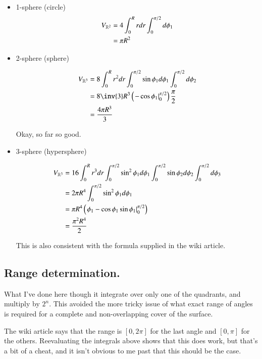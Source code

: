 \begin{itemize}
\item 1-sphere (circle)
\begin{align*}
V_{\mathbb{R}^{2}} 
&= 4 \int_{0}^R r dr \int_{0}^{\pi/2} d\phi_1 \\
&= \pi R^2 
\end{align*}

\item 2-sphere (sphere)

\begin{align*}
V_{\Rm{3}} 
&= 8 \int_0^R r^2 dr \int_0^{\pi/2} \sin\phi_1 d\phi_1 \int_0^{\pi/2} d\phi_2 \\
&= 8 \inv{3} R^3 \left( {\left. -\cos\phi_1 \right\vert}_0^{\pi/2} \right) \frac{\pi}{2} \\
&= \frac{4\pi R^3}{3} \\
\end{align*}

Okay, so far so good.

\item 3-sphere (hypersphere)

\begin{align*}
V_{\mathbb{R}^{3}} 
&= 16 \int_0^R r^3 dr \int_0^{\pi/2} \sin^2\phi_1 d\phi_1 \int_0^{\pi/2} \sin\phi_2 d\phi_2 \int_0^{\pi/2} d\phi_3 \\
&= 2 \pi R^4 \int_0^{\pi/2} \sin^2\phi_1 d\phi_1 \\
&= \pi R^4 \left( {\left.  \phi_1 - \cos\phi_1 \sin\phi_1 \right\vert}_0^{\pi/2} \right) \\
&= \frac{\pi^2 R^4}{2} \\
\end{align*}

This is also consistent with the formula supplied in the wiki article.  

\end{itemize}

\subsection{Range determination. }

What I've done here though it integrate over only one of the quadrants, and multiply by $2^n$.  This avoided the more tricky issue of what exact range of angles is required for a complete and non-overlapping cover of the surface.

The wiki article says that the range is $[0,2\pi]$ for the last angle and $[0,\pi]$ for the others.  
Reevaluating the integrals above shows that this does work, but that's a bit of a cheat, and it isn't obvious
to me past  that this should be the case.


